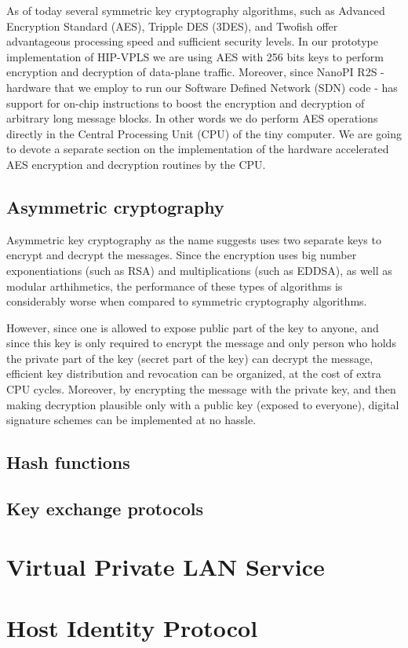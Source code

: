 As of today several symmetric key cryptography algorithms, such as
Advanced Encryption Standard (AES), Tripple DES (3DES), and Twofish
offer advantageous processing speed and sufficient security levels.
In our prototype implementation of HIP-VPLS we are using AES with 256 
bits keys to perform encryption and decryption of data-plane traffic. Moreover,
since NanoPI R2S - hardware that we employ to run our Software Defined Network
(SDN) code - has support for on-chip instructions to boost the 
encryption and decryption of arbitrary long message blocks. In other words
we do perform AES operations directly in the Central Processing Unit (CPU) 
of the tiny computer. We are going to devote a separate section on the 
implementation of the hardware accelerated AES encryption and decryption 
routines by the CPU.

\subsection{Asymmetric cryptography}
Asymmetric key cryptography as the name suggests uses two separate keys
to encrypt and decrypt the messages. Since the encryption uses big number 
exponentiations (such as RSA) and multiplications (such as EDDSA), as well as
modular arthihmetics, the performance of these types of algorithms is 
considerably worse when compared to symmetric cryptography algorithms. 

However, since one is allowed to expose public part of the key to anyone,
and since this key is only required to encrypt the message and only person
who holds the private part of the key (secret part of the key) can decrypt the 
message, efficient key distribution and revocation can be organized, at the cost
of extra CPU cycles. Moreover, by encrypting the message with the private key,
and then making decryption plausible only with a public key (exposed to everyone),
digital signature schemes can be implemented at no hassle.  

\subsection{Hash functions}
\subsection{Key exchange protocols}
\section{Virtual Private LAN Service}
\section{Host Identity Protocol}

